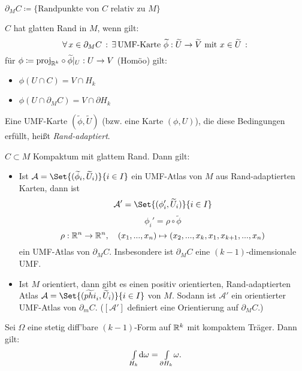 \documentclass{cheat-sheet}
\newcommand{\Atlas}{\mathcal{A}} %
\newcommand{\Intdf}[2]{{\textstyle \int\limits_{#1}} #2} %
\begin{document}

\begin{nota}
  $\partial_M C \coloneqq \{ \text{Randpunkte von $C$ relativ zu $M$} \}$
\end{nota}

\begin{defn}
  $C$ hat glatten Rand in $M$, wenn gilt:
  \[ \forall \, {x \in \partial_M C} \,:\, \exists \, {\text{UMF-Karte } \widetilde{\phi} : \widetilde{U} \to \widetilde{V} \text{ mit } x \in \widetilde{U}} \,:\, \]
  für $\phi \coloneqq \mathrm{proj}_{\mathbb{R}^k} \circ \widetilde{\phi}|_U : U \to V$ (Homöo) gilt:
  \begin{itemize}
    \item $\phi(U \cap C) = V \cap H_k$
    \item $\phi(U \cap \partial_M C) = V \cap \partial H_k$
  \end{itemize}
  Eine UMF-Karte $(\widetilde{\phi}, \widetilde{U})$ (bzw. eine Karte $(\phi, U)$), die diese Bedingungen erfüllt, heißt \emph{Rand-adaptiert}.
\end{defn}

\begin{lem}
  $C \subset M$ Kompaktum mit glattem Rand. Dann gilt:
  \begin{itemize}
    \item  Ist $\Atlas = \Set{ (\widetilde{\phi}_i, \widetilde{U}_i) }{ i \in I }$ ein UMF-Atlas von $M$ aus Rand-adaptierten Karten, dann ist
    \[ \Atlas' = \Set{ (\phi_i', \widetilde{U}_i) }{ i \in I } \]
    \[ \phi_i' = \rho \circ \widetilde{\phi} \]
    \[ \rho : \mathbb{R}^n \to \mathbb{R}^n, \quad (x_1, ..., x_n) \mapsto (x_2, ..., x_k, x_1, x_{k+1}, ..., x_n) \]
    ein UMF-Atlas von $\partial_M C$. Insbesondere ist $\partial_M C$ eine $(k{-}1)$-dimensionale UMF.
    \item Ist $M$ orientiert, dann gibt es einen positiv orientierten, Rand-adaptierten Atlas $\Atlas = \Set{ (\widetilde{phi}_i, \widetilde{U}_i) }{ i \in I }$ von $M$. Sodann ist $\Atlas'$ ein orientierter UMF-Atlas von $\partial_m C$. ($[\Atlas']$ definiert eine Orientierung auf $\partial_M C$.)
  \end{itemize}
\end{lem}


\begin{lem}
  Sei $\Omega$ eine stetig diff'bare $(k{-}1)$-Form auf $\mathbb{R}^k$ mit kompaktem Träger. Dann gilt:
  \[ \Intdf{H_k}{\d \omega} = \Intdf{\partial H_k}{\omega}. \]
\end{lem}

\end{document}
